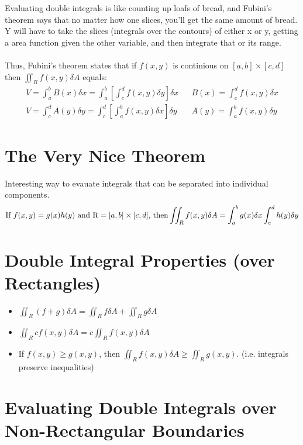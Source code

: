 \documentclass{article}
\begin{document}
Evaluating double integrals is like counting up loafs of bread, and Fubini's theorem says that no matter how one slices, you'll get the same amount of bread. Y will have to take the slices (integrals over the contours) of either x or y, getting a area function given the other variable, and then integrate that or its range. \\ ~ \\
Thus, Fubini's theorem states that if $f(x, y)$ is continious on $[a, b] \times [c, d]$ then $\iint_{R} f(x, y) \delta A$ equals:
\begin{align*}
    V = \int_{a}^{b} B(x) \delta x = \int_{a}^{b} \left[ \int_{c}^{d} f(x,y) \delta y \right] \delta x  &  & B(x) = \int_{c}^{d} f(x, y) \delta x \\
    V = \int_{c}^{d} A(y) \delta y = \int_{c}^{d} \left[ \int_{a}^{b} f(x, y) \delta x \right] \delta y &  & A(y) = \int_{a}^{b} f(x, y) \delta y
\end{align*}


\section {The Very Nice Theorem}

Interesting way to evauate integrals that can be separated into individual components. 
$$\text{If } f(x, y) = g(x)h(y) \text{ and R} = [a, b] \times [c, d] \text{, then} \\ \iint_{R} f(x, y) \delta A = \int_{a}^{b} g(x) \delta x \int_{c}^{d} h(y) \delta y $$

\section{Double Integral Properties (over Rectangles)}

\begin{itemize}
    \item  $\iint_{R} (f + g) \delta A = \iint_{R} f \delta A + \iint_{R} g \delta A$
    \item $\iint_{R} cf(x,y) \delta A = c \iint_{R} f(x, y) \delta A$
    \item If $f(x, y) \ge g(x, y)$, then $\iint_{R} f(x, y) \delta A \ge \iint_{R} g(x, y)$. (i.e. integrals preserve inequalities)
\end{itemize}

\section{Evaluating Double Integrals over Non-Rectangular Boundaries}
\end{document}
